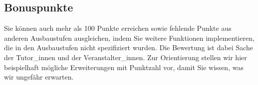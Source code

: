 \subsection{Bonuspunkte}

Sie k\"onnen auch mehr als 100 Punkte erreichen sowie fehlende Punkte
aus anderen Ausbaustufen ausgleichen, indem Sie weitere Funktionen
implementieren, die in den Ausbaustufen nicht spezifiziert wurden. Die
Bewertung ist dabei Sache der Tutor\_innen und der Veranstalter\_innen. Zur
Orientierung stellen wir hier beispielhaft m\"ogliche Erweiterungen mit
Punktzahl vor, damit Sie wissen, was wir ungef\"ahr erwarten.

